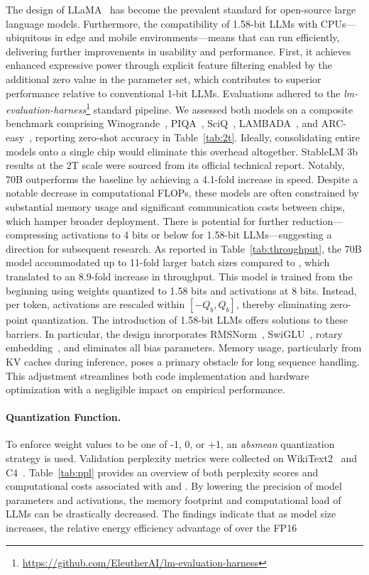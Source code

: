 \begin{itemize}
The design of LLaMA~\cite{llama, llama2} has become the prevalent standard for open-source large language models. Furthermore, the compatibility of 1.58-bit LLMs with CPUs—ubiquitous in edge and mobile environments—means that  can run efficiently, delivering further improvements in usability and performance. First, it achieves enhanced expressive power through explicit feature filtering enabled by the additional zero value in the parameter set, which contributes to superior performance relative to conventional 1-bit LLMs. Evaluations adhered to the \emph{lm-evaluation-harness}\footnote{\url{https://github.com/EleutherAI/lm-evaluation-harness}} standard pipeline. We assessed both models on a composite benchmark comprising Winogrande~\cite{winoGrande}, PIQA~\cite{piqa}, SciQ~\cite{sciq}, LAMBADA~\cite{lambada}, and ARC-easy~\cite{arc}, reporting zero-shot accuracy in Table~\ref{tab:2t}. Ideally, consolidating entire models onto a single chip would eliminate this overhead altogether. StableLM 3b results at the 2T scale were sourced from its official technical report. Notably,  70B outperforms the  baseline by achieving a 4.1-fold increase in speed. Despite a notable decrease in computational FLOPs, these models are often constrained by substantial memory usage and significant communication costs between chips, which hamper broader deployment. There is potential for further reduction—compressing activations to 4 bits or below for 1.58-bit LLMs—suggesting a direction for subsequent research.  As reported in Table~\ref{tab:throughput}, the 70B  model accommodated up to 11-fold larger batch sizes compared to , which translated to an 8.9-fold increase in throughput. This model is trained from the beginning using weights quantized to 1.58 bits and activations at 8 bits. Instead, per token, activations are rescaled within $[-Q_b, Q_b]$, thereby eliminating zero-point quantization. The introduction of 1.58-bit LLMs offers solutions to these barriers. In particular, the design incorporates RMSNorm~\cite{rmsnorm}, SwiGLU~\cite{swiglu}, rotary embedding~\cite{rope}, and eliminates all bias parameters. Memory usage, particularly from KV caches during inference, poses a primary obstacle for long sequence handling. This adjustment streamlines both code implementation and hardware optimization with a negligible impact on empirical performance. \paragraph{Quantization Function.} To enforce weight values to be one of -1, 0, or +1, an \emph{absmean} quantization strategy is used. Validation perplexity metrics were collected on WikiText2~\cite{wikitext2} and C4~\cite{c4}. Table~\ref{tab:ppl} provides an overview of both perplexity scores and computational costs associated with  and . By lowering the precision of model parameters and activations, the memory footprint and computational load of LLMs can be drastically decreased. The findings indicate that as model size increases, the relative energy efficiency advantage of  over the FP16 
\end{itemize}
